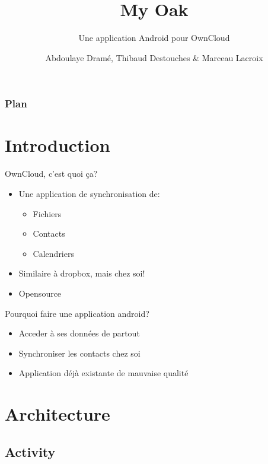 \documentclass{beamer}
\title{My Oak}
\subtitle{Une application Android pour OwnCloud}
\author{Abdoulaye Dramé, Thibaud Destouches \& Marceau Lacroix}
\institute{ISTIC}
\date{}
\begin{document}
\begin{frame}
\titlepage
\end{frame}

\begin{frame}
\frametitle{Plan}
\tableofcontents
\end{frame}




\section{Introduction}

	\begin{frame}{OwnCloud, c'est quoi ça?}
	\begin{itemize}
	\item Une application de synchronisation de:
		\begin{itemize}
		\item Fichiers
		\item Contacts
		\item Calendriers
		\end{itemize}
	\item Similaire à dropbox, mais chez soi!
	\item Opensource
	\end{itemize}
	\end{frame}

	\begin{frame}{Pourquoi faire une application android?}
	\begin{itemize}
	\item Acceder à ses données de partout
	\item Synchroniser les contacts chez soi
	\item Application déjà existante de mauvaise qualité
	\end{itemize}
	\end{frame}

\section{Architecture}

	\subsection{Activity}

		\begin{frame}{}
		\begin{itemize}

		\end{itemize}
		\end{frame}
		\begin{frame}{}
		\begin{itemize}

		\end{itemize}
		\end{frame}
	
\end{document}
